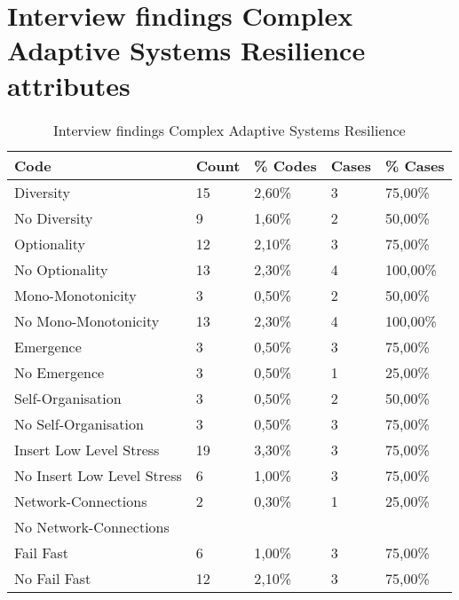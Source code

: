 \section{Interview findings Complex Adaptive Systems Resilience attributes}
\label{sec:interviewresultscasresilience}
\begin{table}[H]
	\centering
	\begin{tabular}{lllll}
		\toprule
		\textbf{Code} & \textbf{Count} & \textbf{\% Codes} &\textbf{Cases} & \textbf{\% Cases} \\
		\midrule
		Diversity & 15    & 2,60\% & 3     & 75,00\% \\
		No Diversity & 9     & 1,60\% & 2     & 50,00\% \\
		Optionality & 12    & 2,10\% & 3     & 75,00\% \\
		No Optionality & 13    & 2,30\% & 4     & 100,00\% \\
		Mono-Monotonicity & 3     & 0,50\% & 2     & 50,00\% \\
		No Mono-Monotonicity & 13    & 2,30\% & 4     & 100,00\% \\
		Emergence & 3     & 0,50\% & 3     & 75,00\% \\
		No Emergence & 3     & 0,50\% & 1     & 25,00\% \\
		Self-Organisation & 3     & 0,50\% & 2     & 50,00\% \\
		No Self-Organisation & 3     & 0,50\% & 3     & 75,00\% \\
		Insert Low Level Stress & 19    & 3,30\% & 3     & 75,00\% \\
		No Insert Low Level Stress & 6     & 1,00\% & 3     & 75,00\% \\
		Network-Connections & 2     & 0,30\% & 1     & 25,00\% \\
		No Network-Connections &       &       &       &  \\
		Fail Fast & 6     & 1,00\% & 3     & 75,00\% \\
		No Fail Fast & 12    & 2,10\% & 3     & 75,00\% \\
		\bottomrule
	\end{tabular}%
	\caption{Interview findings Complex Adaptive Systems Resilience}
	\label{tab:interviewresultscasresilience}%
\end{table}%
